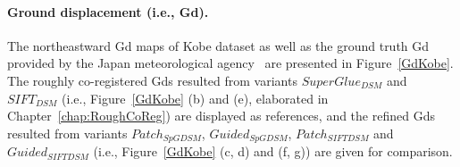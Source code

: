 \paragraph{Ground displacement (i.e., Gd).}
The northeastward Gd %
maps of Kobe dataset as well as the ground truth Gd provided by the Japan meteorological agency~\cite{ian1996morphological} are presented in Figure~\ref{GdKobe}. 
The roughly co-registered Gds resulted from variants $SuperGlue_{DSM}$ and $SIFT_{DSM}$ (i.e., Figure~\ref{GdKobe} (b) and (e), elaborated in Chapter~\ref{chap:RoughCoReg}) are displayed as references, and the refined Gds resulted from variants $Patch_{SpGDSM}$, $Guided_{SpGDSM}$, $Patch_{SIFTDSM}$ and $Guided_{SIFTDSM}$ (i.e., Figure~\ref{GdKobe} (c, d) and (f, g)) are given for comparison. 

